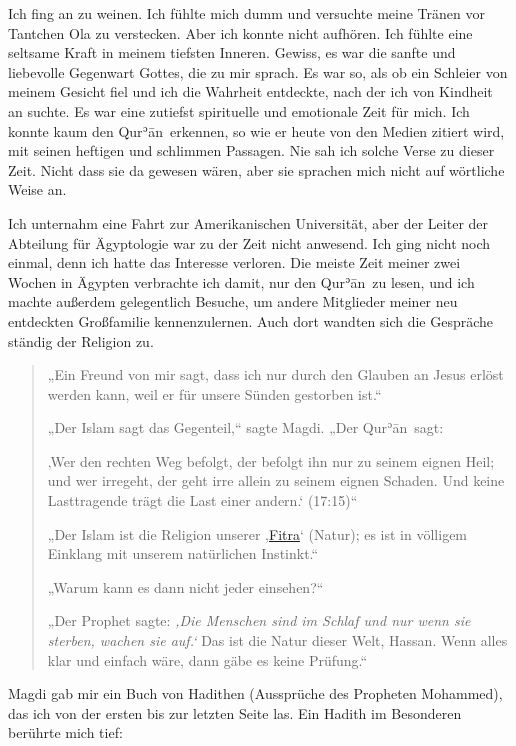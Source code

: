 \documentclass[12pt]{memoir}
\def\´{ʾ} %
\def \Quran{Qur\-\´ān} %
\newcommand{\QRef}[1]{{\color{darkblue}#1}}
\begin{document}
Ich fing an zu weinen.
Ich fühlte mich dumm und versuchte meine Tränen vor Tantchen Ola zu verstecken.
Aber ich konnte nicht aufhören.
Ich fühlte eine seltsame Kraft in meinem tiefsten Inneren.
Gewiss, es war die sanfte und liebevolle Gegenwart Gottes, die zu mir sprach.
Es war so, als ob ein Schleier von meinem Gesicht fiel
und ich die Wahrheit entdeckte, nach der ich von Kindheit an suchte.
Es war eine zutiefst spirituelle und emotionale Zeit für mich.
Ich konnte kaum den \Quran\ erkennen,
so wie er heute von den Medien zitiert wird,
mit seinen heftigen und schlimmen Passagen.
Nie sah ich solche Verse zu dieser Zeit.
Nicht dass sie da gewesen wären,
aber sie sprachen mich nicht auf wörtliche Weise an.

Ich unternahm eine Fahrt zur Amerikanischen Universität,
aber der Leiter der Abteilung für Ägyptologie war zu der Zeit nicht anwesend.
Ich ging nicht noch einmal, denn ich hatte das Interesse verloren.
Die meiste Zeit meiner zwei Wochen in Ägypten verbrachte ich damit,
nur den \Quran\ zu lesen, und ich machte außerdem gelegentlich Besuche,
um andere Mitglieder meiner neu entdeckten Großfamilie kennenzulernen.
Auch dort wandten sich die Gespräche ständig der Religion zu.

\begin{quote}
„Ein Freund von mir sagt,
dass ich nur durch den Glauben an Jesus erlöst werden kann,
weil er für unsere Sünden gestorben ist.“

„Der Islam sagt das Gegenteil,“ sagte Magdi. „Der \Quran\ sagt:

‚Wer den rechten Weg befolgt, der befolgt ihn nur zu seinem eignen Heil;
und wer irregeht, der geht irre allein zu seinem eignen Schaden.
Und keine Lasttragende trägt die Last einer andern.‘
(\QRef{17:15})“

„Der Islam ist die Religion unserer
‚\href{http://de.wikipedia.org/wiki/Fitra}{Fitra}‘ (Natur);
es ist in völligem Einklang mit unserem natürlichen Instinkt.“

„Warum kann es dann nicht jeder einsehen?“

„Der Prophet sagte:
\emph{‚Die Menschen sind im Schlaf und nur wenn sie sterben, wachen sie auf.‘}
Das ist die Natur dieser Welt, Hassan.
Wenn alles klar und einfach wäre, dann gäbe es keine Prüfung.“
\end{quote}

Magdi gab mir ein Buch von Hadithen (Aussprüche des Propheten Mohammed),
das ich von der ersten bis zur letzten Seite las.
Ein Hadith im Besonderen berührte mich tief:
\end{document}
